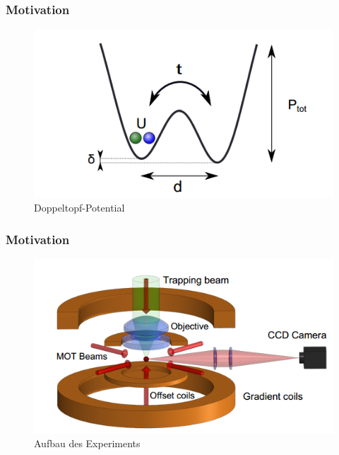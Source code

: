 \documentclass{beamer}
\begin{document}
\begin{frame}
	\frametitle{Motivation}
	\begin{figure}
	\centering
	\includegraphics[scale=0.7]{potentials}
	\caption{Doppeltopf-Potential}
	\end{figure}
\end{frame}
\begin{frame}
	\frametitle{Motivation}
	\begin{figure}
	\centering
	\includegraphics[scale=0.7]{octagon}
	\caption{Aufbau des Experiments}
	\end{figure}
\end{frame}
\end{document}
